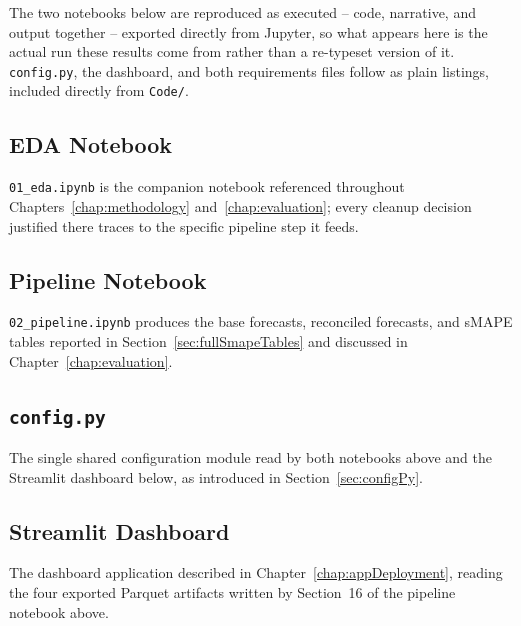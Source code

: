 The two notebooks below are reproduced as executed -- code, narrative, and output together -- exported directly from Jupyter, so what appears here is the actual run these results come from rather than a re-typeset version of it. \texttt{config.py}, the dashboard, and both requirements files follow as plain listings, included directly from \texttt{Code/}.

\subsection{EDA Notebook}
\label{sec:edaListing}

\texttt{01\_eda.ipynb} is the companion notebook referenced throughout Chapters~\ref{chap:methodology} and~\ref{chap:evaluation}; every cleanup decision justified there traces to the specific pipeline step it feeds.



\subsection{Pipeline Notebook}
\label{sec:pipelineListing}

\texttt{02\_pipeline.ipynb} produces the base forecasts, reconciled forecasts, and sMAPE tables reported in Section~\ref{sec:fullSmapeTables} and discussed in Chapter~\ref{chap:evaluation}.



\subsection{\texttt{config.py}}
\label{sec:configListing}

The single shared configuration module read by both notebooks above and the Streamlit dashboard below, as introduced in Section~\ref{sec:configPy}.



\subsection{Streamlit Dashboard}
\label{sec:appListing}

The dashboard application described in Chapter~\ref{chap:appDeployment}, reading the four exported Parquet artifacts written by Section~16 of the pipeline notebook above.


